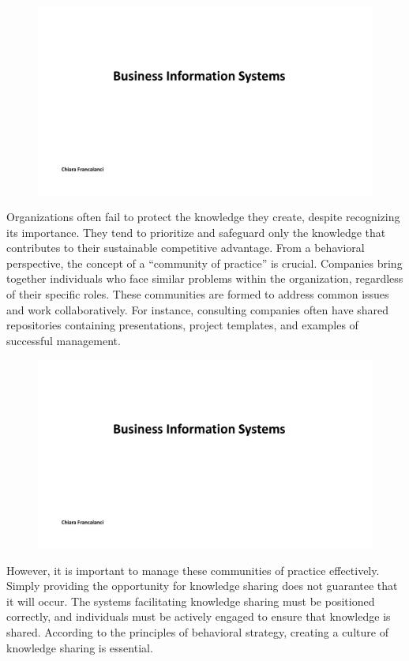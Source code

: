 \begin{figure}[!h]
  \centering
  \includegraphics[page=12, trim = 1.4cm 5cm 1.5cm 3.7cm, clip, width=\imagewidth]{images/05 - KM.pdf}
\end{figure}

Organizations often fail to protect the knowledge they create, despite
recognizing its importance. They tend to prioritize and safeguard only
the knowledge that contributes to their sustainable competitive
advantage. From a behavioral perspective, the concept of a ``community
of practice'' is crucial. Companies bring together individuals who face
similar problems within the organization, regardless of their specific
roles. These communities are formed to address common issues and work
collaboratively. For instance, consulting companies often have shared
repositories containing presentations, project templates, and examples
of successful management.

\begin{figure}[!h]
  \centering
  \includegraphics[page=13, trim = 1.3cm 5.5cm 1.5cm 2.5cm, clip, width=\imagewidth]{images/05 - KM.pdf}
\end{figure}

However, it is important to manage these
communities of practice effectively. Simply providing the opportunity
for knowledge sharing does not guarantee that it will occur. The systems
facilitating knowledge sharing must be positioned correctly, and
individuals must be actively engaged to ensure that knowledge is shared.
According to the principles of behavioral strategy, creating a culture
of knowledge sharing is essential.
